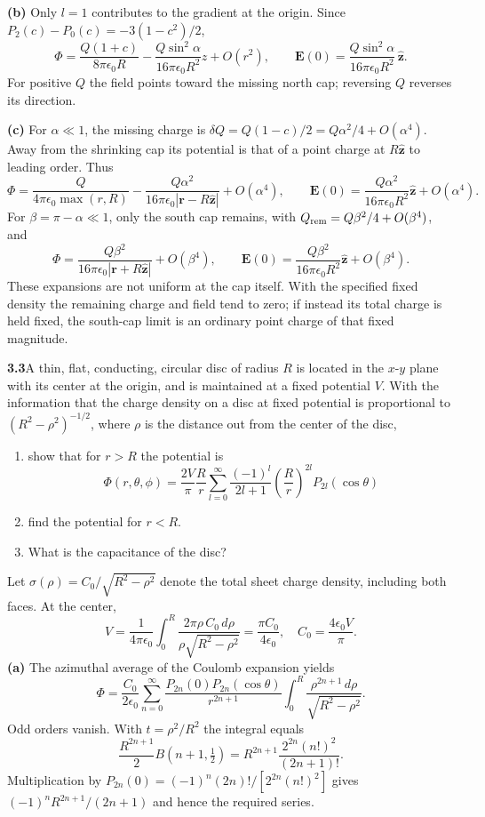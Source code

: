 \textbf{(b)} Only $l=1$ contributes to the gradient at the origin.
Since $P_2(c)-P_0(c)=-3(1-c^2)/2$,
\[
\Phi=\frac{Q(1+c)}{8\pi\epsilon_0R}
-\frac{Q\sin^2\alpha}{16\pi\epsilon_0R^2}z+O(r^2),\qquad
\boxed{\mathbf E(0)=\frac{Q\sin^2\alpha}{16\pi\epsilon_0R^2}\,\hat{\mathbf z}.}
\]
For positive $Q$ the field points toward the missing north cap; reversing
$Q$ reverses its direction.

\textbf{(c)} For $\alpha\ll1$, the missing charge is
$\delta Q=Q(1-c)/2=Q\alpha^2/4+O(\alpha^4)$.
Away from the shrinking cap its potential is that of a point charge at
$R\hat{\mathbf z}$ to leading order.  Thus
\[
\Phi=\frac{Q}{4\pi\epsilon_0\max(r,R)}
-\frac{Q\alpha^2}{16\pi\epsilon_0|\mathbf r-R\hat{\mathbf z}|}
+O(\alpha^4),\qquad
\mathbf E(0)=\frac{Q\alpha^2}{16\pi\epsilon_0R^2}\hat{\mathbf z}
+O(\alpha^4).
\]
For $\beta=\pi-\alpha\ll1$, only the south cap remains, with
$Q_{\rm rem}=Q\beta^2/4+O(\beta^4)$, and
\[
\Phi=\frac{Q\beta^2}{16\pi\epsilon_0|\mathbf r+R\hat{\mathbf z}|}
+O(\beta^4),\qquad
\mathbf E(0)=\frac{Q\beta^2}{16\pi\epsilon_0R^2}\hat{\mathbf z}
+O(\beta^4).
\]
These expansions are not uniform at the cap itself.  With the specified
fixed density the remaining charge and field tend to zero; if instead
its total charge is held fixed, the south-cap limit is an ordinary
point charge of that fixed magnitude.

\par\bigskip
\noindent\textbf{3.3}\quad A thin, flat, conducting, circular disc of radius $R$ is located in the $x$-$y$ plane with its center at the origin, and is maintained at a fixed potential $V$. With the information that the charge density on a disc at fixed potential is proportional to $(R^{2}-\rho^{2})^{-1/2}$, where $\rho$ is the distance out from the center of the disc,
\begin{enumerate}
\item[(a)] show that for $r>R$ the potential is
\[
\Phi(r,\theta,\phi)=\frac{2V}{\pi}\frac{R}{r}\sum_{l=0}^{\infty}\frac{(-1)^{l}}{2l+1}\left(\frac{R}{r}\right)^{2l}P_{2l}(\cos\theta)
\]
\item[(b)] find the potential for $r<R$.
\item[(c)] What is the capacitance of the disc?
\end{enumerate}
\solution

Let $\sigma(\rho)=C_0/\sqrt{R^2-\rho^2}$ denote the total sheet
charge density, including both faces.  At the center,
\[
V=\frac{1}{4\pi\epsilon_0}\int_0^R
\frac{2\pi\rho\,C_0\,d\rho}{\rho\sqrt{R^2-\rho^2}}
=\frac{\pi C_0}{4\epsilon_0},
\quad C_0=\frac{4\epsilon_0V}{\pi}.
\]
\textbf{(a)} The azimuthal average of the Coulomb expansion yields
\[
\Phi=\frac{C_0}{2\epsilon_0}
\sum_{n=0}^\infty\frac{P_{2n}(0)P_{2n}(\cos\theta)}{r^{2n+1}}
\int_0^R\frac{\rho^{2n+1}\,d\rho}{\sqrt{R^2-\rho^2}}.
\]
Odd orders vanish.  With $t=\rho^2/R^2$ the integral equals
\[
\frac{R^{2n+1}}2 B(n+1,\tfrac12)
=R^{2n+1}\frac{2^{2n}(n!)^2}{(2n+1)!}.
\]
Multiplication by $P_{2n}(0)=(-1)^n(2n)!/[2^{2n}(n!)^2]$
gives $(-1)^nR^{2n+1}/(2n+1)$ and hence the required series.

